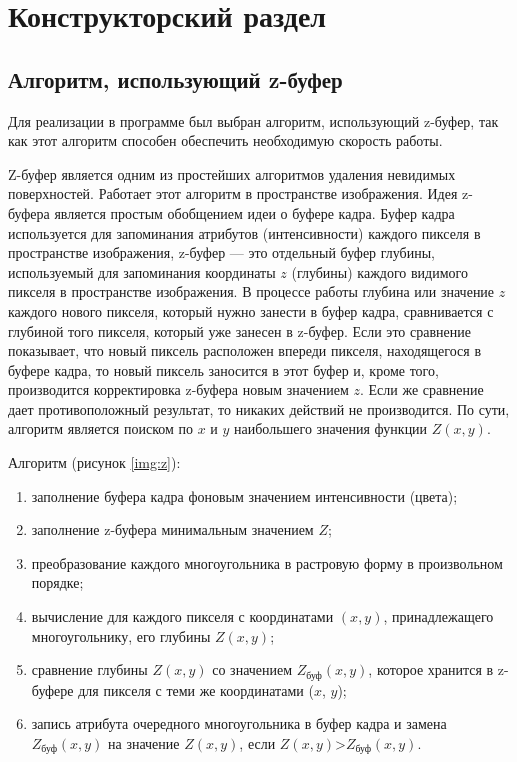 \chapter{Конструкторский раздел}

\section{Алгоритм, использующий z-буфер}

Для реализации в программе был выбран алгоритм, использующий z-буфер, так как этот алгоритм способен обеспечить необходимую скорость работы.

Z-буфер является одним из простейших алгоритмов удаления невидимых поверхностей. Работает этот алгоритм в пространстве изображения. Идея z-буфера является простым обобщением идеи о буфере кадра. Буфер кадра используется для запоминания атрибутов (интенсивности) каждого пикселя в пространстве изображения, z-буфер --- это отдельный буфер глубины, используемый для запоминания координаты $z$ (глубины) каждого видимого пикселя в пространстве изображения. В процессе работы глубина или значение $z$ каждого нового пикселя, который нужно занести в буфер кадра, сравнивается с глубиной того пикселя, который уже занесен в z-буфер. Если это сравнение показывает, что новый пиксель расположен впереди пикселя, находящегося в буфере кадра, то новый пиксель заносится в этот буфер и, кроме того, производится корректировка z-буфера новым значением $z$. Если же сравнение дает противоположный результат, то никаких действий не производится. По сути, алгоритм является поиском по $x$ и $y$ наибольшего значения функции $Z(x, y)$. 

Алгоритм (рисунок \ref{img:z}):
\begin{enumerate}[label=\arabic*)]
    \item заполнение буфера кадра фоновым значением интенсивности (цвета);
    \item заполнение z-буфера минимальным значением $Z$;
    \item преобразование каждого многоугольника в растровую форму в произвольном порядке;
    \item вычисление для каждого пикселя с координатами $(x, y)$, принадлежащего многоугольнику, его глубины $Z(x, y)$;
    \item сравнение глубины $Z(x, y)$ со значением $Z_{\text{буф}}(x, y)$, которое хранится в z-буфере для пикселя с теми же координатами ($x$, $y$);
    \item запись атрибута очередного многоугольника в буфер кадра и замена $Z_{\text{буф}}(x, y)$ на значение $Z(x, y)$, если $Z(x, y)$>$Z_{\text{буф}}(x, y)$.
\end{enumerate}

